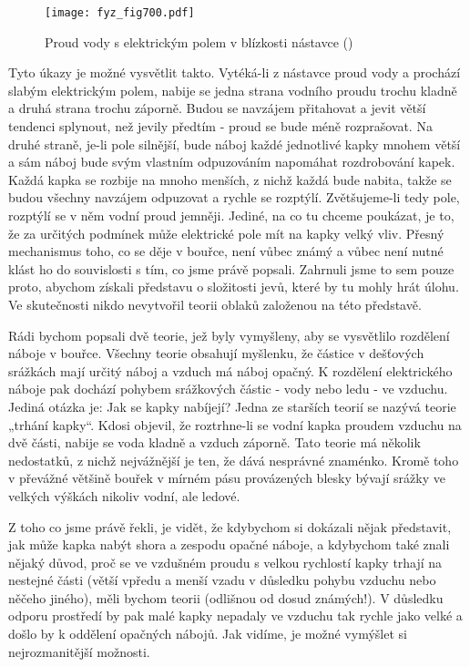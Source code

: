     \begin{figure}[ht!] %
      \centering
      \texttt{[image: fyz\_fig700.pdf]}
      \caption{Proud vody s elektrickým polem v blízkosti nástavce (\cite[s.~707]{Feynman02})}
      \label{fyz:fig700}
    \end{figure}

    Tyto úkazy je možné vysvětlit takto. Vytéká-li z nástavce proud vody a prochází slabým
    elektrickým polem, nabije se jedna strana vodního proudu trochu kladně a druhá strana trochu
    záporně. Budou se navzájem přitahovat a jevit větší tendenci splynout, než jevily předtím -
    proud se bude méně rozprašovat. Na druhé straně, je-li pole silnější, bude náboj každé
    jednotlivé kapky mnohem větší a sám náboj bude svým vlastním odpuzováním napomáhat rozdrobování
    kapek. Každá kapka se rozbije na mnoho menších, z nichž každá bude nabita, takže se budou
    všechny navzájem odpuzovat a rychle se rozptýlí. Zvětšujeme-li tedy pole, rozptýlí se v něm
    vodní proud jemněji. Jediné, na co tu chceme poukázat, je to, že za určitých podmínek může
    elektrické pole mít na kapky velký vliv. Přesný mechanismus toho, co se děje v bouřce, není
    vůbec známý a vůbec není nutné klást ho do souvislosti s tím, co jsme právě popsali. Zahrnuli
    jsme to sem pouze proto, abychom získali představu o složitosti jevů, které by tu mohly hrát
    úlohu. Ve skutečnosti nikdo nevytvořil teorii oblaků založenou na této představě.

    Rádi bychom popsali dvě teorie, jež byly vymyšleny, aby se vysvětlilo rozdělení náboje v bouřce.
    Všechny teorie obsahují myšlenku, že částice v dešťových srážkách mají určitý náboj a vzduch má
    náboj opačný. K rozdělení elektrického náboje pak dochází pohybem srážkových částic - vody nebo
    ledu - ve vzduchu. Jediná otázka je: Jak se kapky nabíjejí? Jedna ze starších teorií se nazývá
    teorie „trhání kapky“. Kdosi objevil, že roztrhne-li se vodní kapka proudem vzduchu na dvě
    části, nabije se voda kladně a vzduch záporně. Tato teorie má několik nedostatků, z nichž
    nejvážnější je ten, že dává nesprávné znaménko. Kromě toho v převážné většině bouřek v mírném
    pásu provázených blesky bývají srážky ve velkých výškách nikoliv vodní, ale ledové.

    Z toho co jsme právě řekli, je vidět, že kdybychom si dokázali nějak představit, jak může kapka
    nabýt shora a zespodu opačné náboje, a kdybychom také znali nějaký důvod, proč se ve vzdušném
    proudu s velkou rychlostí kapky trhají na nestejné části (větší vpředu a menší vzadu v důsledku
    pohybu vzduchu nebo něčeho jiného), měli bychom teorii (odlišnou od dosud známých!). V důsledku
    odporu prostředí by pak malé kapky nepadaly ve vzduchu tak rychle jako velké a došlo by k
    oddělení opačných nábojů. Jak vidíme, je možné vymýšlet si nejrozmanitější možnosti.


